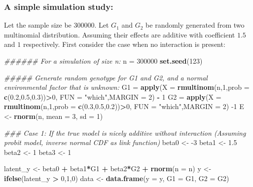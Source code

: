 \documentclass[]{article}
\newenvironment{Shaded}{\begin{snugshade}}{\end{snugshade}}
\newcommand{\CommentTok}[1]{\textcolor[rgb]{0.56,0.35,0.01}{\textit{#1}}}
\newcommand{\DataTypeTok}[1]{\textcolor[rgb]{0.13,0.29,0.53}{#1}}
\newcommand{\DecValTok}[1]{\textcolor[rgb]{0.00,0.00,0.81}{#1}}
\newcommand{\FloatTok}[1]{\textcolor[rgb]{0.00,0.00,0.81}{#1}}
\newcommand{\KeywordTok}[1]{\textcolor[rgb]{0.13,0.29,0.53}{\textbf{#1}}}
\newcommand{\NormalTok}[1]{#1}
\newcommand{\OperatorTok}[1]{\textcolor[rgb]{0.81,0.36,0.00}{\textbf{#1}}}
\newcommand{\StringTok}[1]{\textcolor[rgb]{0.31,0.60,0.02}{#1}}
\begin{document}
\hypertarget{a-simple-simulation-study}{%
\subsubsection{A simple simulation
study:}\label{a-simple-simulation-study}}

Let the sample size be 300000. Let \(G_1\) and \(G_2\) be randomly
generated from two multinomial distribution. Assuming their effects are
additive with coefficient \(1.5\) and \(1\) respectively. First consider
the case when no interaction is present:

\begin{Shaded}
\begin{Highlighting}[]
\CommentTok{###### For a simulation of size n:}
\NormalTok{n =}\StringTok{ }\DecValTok{300000}
\KeywordTok{set.seed}\NormalTok{(}\DecValTok{123}\NormalTok{)}



\CommentTok{##### Generate random genotype for G1 and G2, and a normal environmental factor that is unknown:}
\NormalTok{G1 =}\StringTok{ }\KeywordTok{apply}\NormalTok{(}\DataTypeTok{X =} \KeywordTok{rmultinom}\NormalTok{(n,}\DecValTok{1}\NormalTok{,}\DataTypeTok{prob =} \KeywordTok{c}\NormalTok{(}\FloatTok{0.2}\NormalTok{,}\FloatTok{0.5}\NormalTok{,}\FloatTok{0.3}\NormalTok{))}\OperatorTok{>}\DecValTok{0}\NormalTok{, }\DataTypeTok{FUN =} \StringTok{"which"}\NormalTok{,}\DataTypeTok{MARGIN =} \DecValTok{2}\NormalTok{) }\OperatorTok{-}\StringTok{ }\DecValTok{1}
\NormalTok{G2 =}\StringTok{ }\KeywordTok{apply}\NormalTok{(}\DataTypeTok{X =} \KeywordTok{rmultinom}\NormalTok{(n,}\DecValTok{1}\NormalTok{,}\DataTypeTok{prob =} \KeywordTok{c}\NormalTok{(}\FloatTok{0.3}\NormalTok{,}\FloatTok{0.5}\NormalTok{,}\FloatTok{0.2}\NormalTok{))}\OperatorTok{>}\DecValTok{0}\NormalTok{, }\DataTypeTok{FUN =} \StringTok{"which"}\NormalTok{,}\DataTypeTok{MARGIN =} \DecValTok{2}\NormalTok{)  }\DecValTok{-1}
\NormalTok{E <-}\StringTok{ }\KeywordTok{rnorm}\NormalTok{(n, }\DataTypeTok{mean =} \DecValTok{3}\NormalTok{, }\DataTypeTok{sd =} \DecValTok{1}\NormalTok{)}

\CommentTok{### Case 1: If the true model is nicely additive without interaction (Assuming probit model, inverse normal CDF as link function)}
\NormalTok{beta0 <-}\StringTok{ }\DecValTok{-3}
\NormalTok{beta1 <-}\StringTok{ }\FloatTok{1.5}
\NormalTok{beta2 <-}\StringTok{ }\DecValTok{1}
\NormalTok{beta3 <-}\StringTok{ }\DecValTok{1}

\NormalTok{latent_y <-}\StringTok{ }\NormalTok{beta0 }\OperatorTok{+}\StringTok{ }\NormalTok{beta1}\OperatorTok{*}\NormalTok{G1 }\OperatorTok{+}\StringTok{ }\NormalTok{beta2}\OperatorTok{*}\NormalTok{G2 }\OperatorTok{+}\StringTok{ }\KeywordTok{rnorm}\NormalTok{(}\DataTypeTok{n =}\NormalTok{ n)}
\NormalTok{y <-}\StringTok{ }\KeywordTok{ifelse}\NormalTok{(latent_y }\OperatorTok{>}\StringTok{ }\DecValTok{0}\NormalTok{,}\DecValTok{1}\NormalTok{,}\DecValTok{0}\NormalTok{)}
\NormalTok{data <-}\StringTok{ }\KeywordTok{data.frame}\NormalTok{(}\DataTypeTok{y =}\NormalTok{ y, }\DataTypeTok{G1 =}\NormalTok{ G1, }\DataTypeTok{G2 =}\NormalTok{ G2)}



\end{Highlighting}
\end{Shaded}
\end{document}

